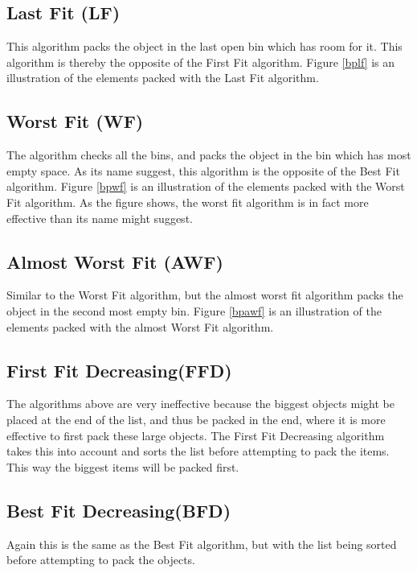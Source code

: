 \subsection{Last Fit (LF)}
This algorithm packs the object in the last open bin which has room for it. This algorithm is thereby the opposite of the First Fit algorithm. Figure \ref{bplf} is an illustration of the elements packed with the Last Fit algorithm.

\subsection{Worst Fit (WF)}
The algorithm checks all the bins, and packs the object in the bin which has most empty space. As its name suggest, this algorithm is the opposite of the Best Fit algorithm. Figure \ref{bpwf} is an illustration of the elements packed with the Worst Fit algorithm. As the figure shows, the worst fit algorithm is in fact more effective than its name might suggest. 

\subsection{Almost Worst Fit (AWF)}
Similar to the Worst Fit algorithm, but the almost worst fit algorithm packs the object in the second most empty bin.  Figure \ref{bpawf} is an illustration of the elements packed with the almost Worst Fit algorithm.

\subsection{First Fit Decreasing(FFD)}
The algorithms above are very ineffective because the biggest objects might be placed at the end of the list, and thus be packed in the end, where it is more effective to first pack these large objects.
The First Fit Decreasing algorithm takes this into account and sorts the list before attempting to pack the items. This way the biggest items will be packed first.

\subsection{Best Fit Decreasing(BFD)}
Again this is the same as the Best Fit algorithm, but with the list being sorted before attempting to pack the objects.

